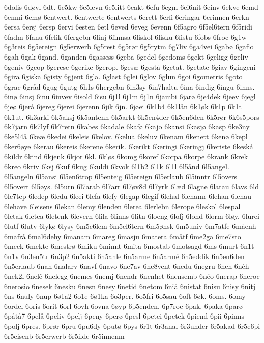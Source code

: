 6dolis
6døvl
6dt.
6e5kw
6e5levn
6e5litt
6eakt
6efu
6egm
6ei6nit
6einv
6ekve
6emd
6emni
6emø
6entwert.
6entwerte
6entwerts
6erett
6erfi
6eringar
6erinnen
6erkn
6ersa
6ersj
6ersp
6ervi
6esten
6etl
6eved
6eveg
6evenn
6f5agro
6f5el6tern
6f5ridi
6fadm
6fanu
6felik
6fergebn
6finj
6finnsa
6fiskol
6fisku
6fistu
6fobs
6froc
6g1w
6g3reis
6g5ereign
6g5erwerb
6g5rest
6g5rør
6g5rytm
6g7liv
6ga4vei
6gabø
6gaflo
6gah
6gak
6gand.
6ganden
6gassess
6geba
6gedel
6gedoms
6gekt
6geligg
6geliv
6geniv
6geop
6gerese
6gerike
6gerop.
6gesæ
6gestå
6getat.
6getate
6giav
6gingeni
6gira
6giska
6gisty
6gjent
6gla.
6glast
6glei
6glov
6glun
6goi
6gometris
6goto
6grac
6gråd
6gug
6gutg
6h1s
6hergebn
6in3sy
6in7haltu
6ina
6indig
6ingu
6inns.
6inø
6insj
6inu
6invev
6isold
6isu
6j1l
6j1m
6j1n
6jambi
6jarø
6je4dek
6jeev
6jegl
6jeø
6jerå
6jereg
6jerei
6jerenn
6jik
6jn.
6jøei
6k1b4
6k1lån
6k1øk
6k1p
6k1t
6k1ut.
6k3arki
6k5aksj
6k5antenn
6k5arkt
6k5en4der
6k5en6den
6k5rør
6k6s5pors
6k7jarn
6k7lyf
6k7retn
6kabes
6kadale
6kafø
6kajo
6kansi
6kasjø
6kasp
6ke3ny
6ke5l4å
6keæ
6kedei
6keleis
6kelov.
6kelua
6keluv
6kenam
6kenett
6kenø
6kepl
6ker6øye
6kerau
6kereis
6kerene
6kerik.
6kerikt
6keringi
6keringj
6keriste
6keskå
6kildr
6kind
6kjenk
6kjor
6kl.
6kløs
6komg
6koref
6korpa
6korpe
6krank
6krek
6kreo
6kriv
6ksj
6kuf
6kug
6kuldi
6kvok
6l1b2
6l1k
6l1l
6l5ånd
6l5angel.
6l5angeln
6l5ansi
6l5en6trop
6l5enteig
6l5ereign
6l5erlaub
6l5inntr
6l5overs
6l5overt
6l5øys.
6l5urn
6l7arab
6l7arr
6l7øv8d
6l7yrk
6læd
6lagne
6latau
6lavs
6ld
6le7tep
6ledep
6ledu
6leei
6lefa
6lefy
6legap
6legif
6lehal
6lehamr
6lehan
6lehau
6lehave
6leisens
6lekan
6lemy
6lenden
6lerea
6lerlebn
6lerope
6leskol
6lespal
6letak
6letea
6letenk
6levern
6lila
6linns
6litn
6loeng
6lofj
6lond
6lorm
6løy.
6lurei
6lutf
6lutv
6lykø
6lysy
6m5e6lem
6m5el6tern
6m5ønsk
6m5univ
6m7atfe
6måenh
6mafrå
6mal6dehy
6manam
6mareg
6masju
6matera
6måtf
6me2ga
6me7sto
6meek
6mekte
6mestrø
6miku
6minnt
6mita
6mostab
6motsagd
6ms
6murt
6n1t
6n1v
6n3en5tr
6n3p2
6n5akti
6n5anle
6n5arme
6n5armé
6n5eddik
6n5en6den
6n5erlaub
6nah
6nalarv
6navf
6navo
6ne7av
6ne8vent
6nedu
6negru
6neh
6néh
6nek2l
6nelê
6nelegg
6nemes
6nemj
6nendr
6nenhet
6nensemb
6néo
6nerap
6neroc
6nerosio
6nesek
6nesku
6nesn
6nesy
6netid
6netom
6niå
6nistat
6nisu
6nisy
6nitj
6ns
6nuly
6nup
6ø1a2
6o1e
6ø1ka
6o3per.
6o5fri
6o5sau
6oft
6øk.
6oms.
6omy
6ordel
6oris
6orit
6orl
6ovh
6ovna
6øyp
6p5enden.
6p7roc
6pak.
6paka
6parø
6påtå7
6pelå
6peliv
6pelj
6peny
6perø
6pesl
6petei
6petek
6piend
6pii
6pinns
6polj
6pres.
6prør
6pru
6pu6dy
6putø
6pys
6r1t
6r3anal
6r3under
6r5akad
6r5e6pi
6r5eisenb
6r5erwerb
6r5ilde
6r5innenm
